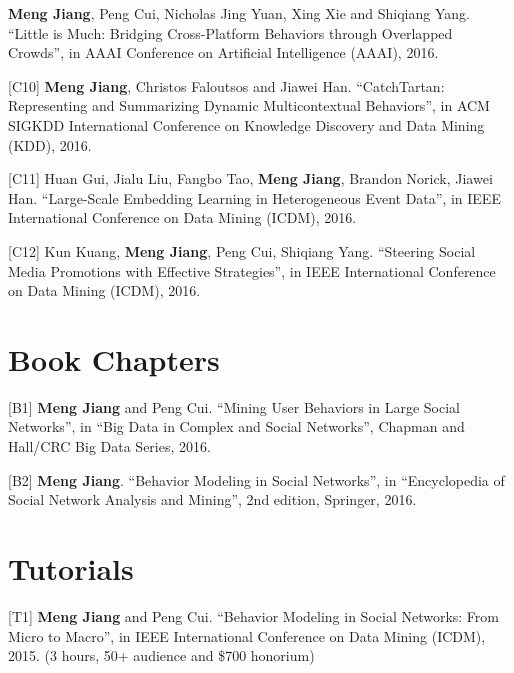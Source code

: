 \documentclass[margin, 10pt]{res}
\begin{document}
\begin{resume}
[C9] \textbf{Meng Jiang}, Peng Cui, Nicholas Jing Yuan, Xing Xie and Shiqiang Yang. ``Little is Much: Bridging Cross-Platform Behaviors through Overlapped Crowds'', in AAAI Conference on Artificial Intelligence (AAAI), 2016.

[C10] \textbf{Meng Jiang}, Christos Faloutsos and Jiawei Han. ``CatchTartan: Representing and Summarizing Dynamic Multicontextual Behaviors'', in ACM SIGKDD International Conference on Knowledge Discovery and Data Mining (KDD), 2016.

[C11] Huan Gui, Jialu Liu, Fangbo Tao, \textbf{Meng Jiang}, Brandon Norick, Jiawei Han. ``Large-Scale Embedding Learning in Heterogeneous Event Data'', in IEEE International Conference on Data Mining (ICDM), 2016.

[C12] Kun Kuang, \textbf{Meng Jiang}, Peng Cui, Shiqiang Yang. ``Steering Social Media Promotions with Effective Strategies'', in IEEE International Conference on Data Mining (ICDM), 2016.


\section{Book Chapters}

[B1] \textbf{Meng Jiang} and Peng Cui. ``Mining User Behaviors in Large Social Networks'', in ``Big Data in Complex and Social Networks'', Chapman and Hall/CRC Big Data Series, 2016.

[B2] \textbf{Meng Jiang}. ``Behavior Modeling in Social Networks'', in ``Encyclopedia of Social Network Analysis and Mining'', 2nd edition, Springer, 2016.


\section{Tutorials}

[T1] \textbf{Meng Jiang} and Peng Cui. ``Behavior Modeling in Social Networks: From Micro to Macro'', in IEEE International Conference on Data Mining (ICDM), 2015. (3 hours, 50+ audience and \$700 honorium)


\end{resume}
\end{document}
